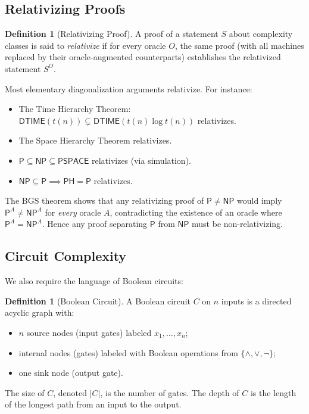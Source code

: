 \documentclass[11pt,a4paper]{article}
\theoremstyle{plain}
\theoremstyle{definition}
\newtheorem{definition}[theorem]{Definition}
\theoremstyle{remark}
\newcommand{\PP}{\mathsf{P}}
\newcommand{\NP}{\mathsf{NP}}
\newcommand{\PSPACE}{\mathsf{PSPACE}}
\newcommand{\PH}{\mathsf{PH}}
\newcommand{\DTIME}{\mathsf{DTIME}}
\begin{document}
\subsection{Relativizing Proofs}

\begin{definition}[Relativizing Proof]
A proof of a statement $S$ about complexity classes is said to
\emph{relativize} if for every oracle $O$, the same proof (with all machines
replaced by their oracle-augmented counterparts) establishes the relativized
statement $S^O$.
\end{definition}

Most elementary diagonalization arguments relativize.  For instance:

\begin{itemize}
    \item The Time Hierarchy Theorem: $\DTIME(t(n)) \subsetneq \DTIME(t(n) \log t(n))$
    relativizes.
    \item The Space Hierarchy Theorem relativizes.
    \item $\PP \subseteq \NP \subseteq \PSPACE$ relativizes (via simulation).
    \item $\NP \subseteq \PP \implies \PH = \PP$ relativizes.
\end{itemize}

The BGS theorem shows that any relativizing proof of $\PP \neq \NP$ would imply
$\PP^A \neq \NP^A$ for \emph{every} oracle $A$, contradicting the existence of
an oracle where $\PP^A = \NP^A$.  Hence any proof separating $\PP$ from $\NP$
must be non-relativizing.

\subsection{Circuit Complexity}

We also require the language of Boolean circuits:

\begin{definition}[Boolean Circuit]
A Boolean circuit $C$ on $n$ inputs is a directed acyclic graph with:
\begin{itemize}
    \item $n$ source nodes (input gates) labeled $x_1, \ldots, x_n$;
    \item internal nodes (gates) labeled with Boolean operations from $\{\land,
    \lor, \lnot\}$;
    \item one sink node (output gate).
\end{itemize}
The size of $C$, denoted $|C|$, is the number of gates.  The depth of $C$ is the
length of the longest path from an input to the output.
\end{definition}
\end{document}
